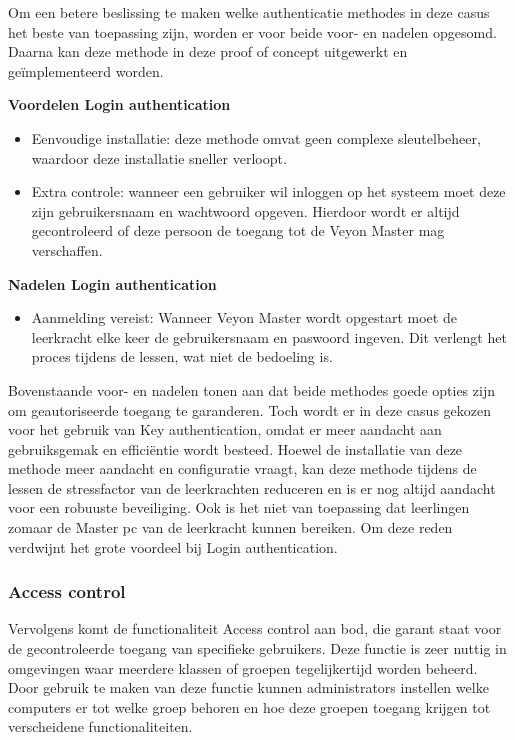  Om een betere beslissing te maken welke authenticatie methodes in deze casus het beste van toepassing zijn, worden er voor beide voor- en nadelen opgesomd. Daarna kan deze methode in deze proof of concept uitgewerkt en geïmplementeerd worden.\newline
 
 \textbf{Voordelen Login authentication}
 \begin{itemize}
     \item Eenvoudige installatie: deze methode omvat geen complexe sleutelbeheer, waardoor deze installatie sneller verloopt.
     \item Extra controle: wanneer een gebruiker wil inloggen op het systeem moet deze zijn gebruikersnaam en wachtwoord opgeven. Hierdoor wordt er altijd gecontroleerd of deze persoon de toegang tot de Veyon Master mag verschaffen.
 \end{itemize}
  \textbf{Nadelen Login authentication}
 \begin{itemize}
     \item Aanmelding vereist: Wanneer Veyon Master wordt opgestart moet de leerkracht elke keer de gebruikersnaam en paswoord ingeven. Dit verlengt het proces tijdens de lessen, wat niet de bedoeling is.
 \end{itemize}
 
 Bovenstaande voor- en nadelen tonen aan dat beide methodes goede opties zijn om geautoriseerde toegang te garanderen. Toch wordt er in deze casus gekozen voor het gebruik van Key authentication, omdat er meer aandacht aan gebruiksgemak en efficiëntie wordt besteed. Hoewel de installatie van deze methode meer aandacht en configuratie vraagt, kan deze methode tijdens de lessen de stressfactor van de leerkrachten reduceren en is er nog altijd aandacht voor een robuuste beveiliging. Ook is het niet van toepassing dat leerlingen zomaar de Master pc van de leerkracht kunnen bereiken. Om deze reden verdwijnt het grote voordeel bij Login authentication.  
 
 \subsubsection{Access control}
 
 Vervolgens komt de functionaliteit Access control aan bod, die garant staat voor de gecontroleerde toegang van specifieke gebruikers. Deze functie is zeer nuttig in omgevingen waar meerdere klassen of groepen tegelijkertijd worden beheerd. Door gebruik te maken van deze functie kunnen administrators instellen welke computers er tot welke groep behoren en hoe deze groepen toegang krijgen tot verscheidene functionaliteiten.
 
